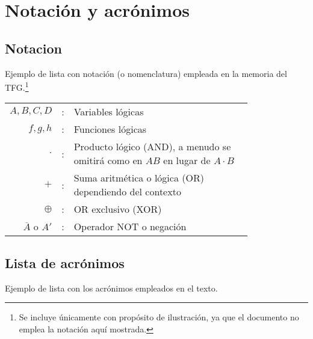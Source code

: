 %
%
\cleardoublepage
{} %


\chapter*{Notación y acrónimos} %

\section*{Notacion}
Ejemplo de lista con notación (o nomenclatura) empleada en la memoria del TFG.\footnote{Se incluye únicamente con propósito de ilustración, ya que el documento no emplea la notación aquí mostrada.}

\begin{tabular}{r r p{0.8\linewidth}}
$A, B, C, D$	& : & Variables lógicas \\
$f, g, h$		& :	& Funciones lógicas \\
$\cdot$			& : & Producto lógico (AND), a menudo se omitirá como en $A 
B$ en lugar de $A \cdot B$\\
$+$				& : & Suma aritmética o lógica (OR) dependiendo del 
contexto\\
$\oplus$		& : & OR exclusivo (XOR)\\
$\overline{A}$ o ${A}'$	& : & Operador NOT o negación
\end{tabular}

\section*{Lista de acrónimos}
Ejemplo de lista con los acrónimos empleados en el texto.

